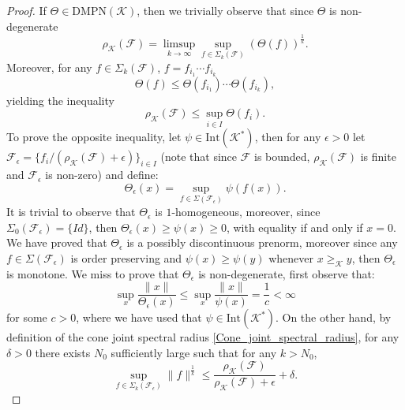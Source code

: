 \documentclass[10pt,a4paper]{amsart}
\newcommand{\DMPN}{\mathrm{DMPN}}
\newcommand{\cgeq}{\geq_{\cone}}
\newcommand{\cone}{\mathcal{K}}
\newcommand{\cradius}{\rho_{\cone}}
\newcommand{\family}{\mathcal{F}}
\newcommand{\interior}{\mathrm{Int}}
\begin{document}
    \begin{proof}
        If $\Theta\in \DMPN(\cone)$, then we trivially observe that since $\Theta$ is non-degenerate 
        \begin{equation}
            \cradius(\family)=\limsup_{k\rightarrow \infty}\sup_{f\in\Sigma_k(\family)}(\Theta(f))^{\frac{1}{k}}.
        \end{equation}
        Moreover, for any $f\in\Sigma_k(\family)$, $f=f_{i_1}\cdots f_{i_k}$
        \begin{equation}
            \Theta(f)\leq \Theta(f_{i_1})\cdots \Theta(f_{i_k}),
        \end{equation}
        yielding the inequality
        \begin{equation}
            \cradius(\family)\leq \sup_{i\in I}\Theta(f_i).
        \end{equation}
        To prove the opposite inequality, let $\psi\in \interior(\cone^*)$, then for any $\epsilon>0$ let $\family_\epsilon=\{f_i/(\cradius(\family)+\epsilon)\}_{i\in I}$ (note that since $\family$ is bounded, $\cradius(\family)$ is finite and $\family_\epsilon$ is non-zero) and define:
        \begin{equation}
            \Theta_{\epsilon}(x)=\sup_{f\in \Sigma(\family_{\epsilon})}\psi(f(x)).
        \end{equation}
        It is trivial to observe that  $\Theta_{\epsilon}$ is $1$-homogeneous, moreover, since $\Sigma_0(\family_\epsilon)=\{Id\}$, then $\Theta_{\epsilon}(x)\geq \psi(x)\geq 0$, with equality if and only if $x=0$. We have proved that $\Theta_\epsilon$ is a possibly discontinuous prenorm, moreover
        since any $f\in \Sigma(\family_\epsilon)$ is order preserving and $\psi(x)\geq \psi(y)$ whenever $x\cgeq y$, then $\Theta_\epsilon$ is monotone. We miss to prove that $\Theta_{\epsilon}$ is non-degenerate, first observe that:
        \begin{equation}
            \sup_x \frac{\|x\|}{\Theta_{\epsilon}(x)}\leq \sup_x \frac{\|x\|}{\psi(x)}=\frac{1}{c} <\infty
        \end{equation}
        for some $c>0$, where we have used that $\psi\in \interior(\cone^*)$.
        On the other hand, by definition of the cone joint spectral radius \eqref{Cone_joint_spectral_radius}, for any $\delta>0$ there exists $N_0$ sufficiently large such that for any $k>N_0$, 
        \begin{equation}        \sup_{f\in\Sigma_k(\family_\epsilon)}\|f\|^{\frac{1}{k}}\leq \frac{\cradius(\family)}{\cradius(\family)+\epsilon}+\delta.

\end{equation}
\end{proof}
\end{document}
